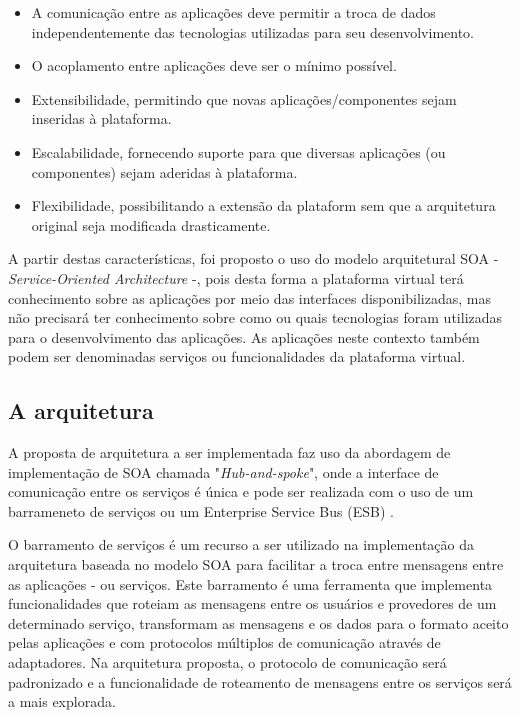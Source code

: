 \begin{itemize}
\item A comunicação entre as aplicações deve permitir a troca de dados independentemente das tecnologias utilizadas para seu desenvolvimento.
\item O acoplamento entre aplicações deve ser o mínimo possível.
\item Extensibilidade, permitindo que novas aplicações/componentes sejam inseridas à plataforma.
\item Escalabilidade, fornecendo suporte para que diversas aplicações (ou componentes) sejam aderidas à plataforma.
\item Flexibilidade,  possibilitando a extensão da plataform sem que a arquitetura original seja modificada drasticamente.
\end{itemize}

A partir destas características, foi proposto o uso do modelo arquitetural SOA - \textit{Service-Oriented Architecture} -, pois desta forma a plataforma virtual terá conhecimento sobre as aplicações por meio das interfaces disponibilizadas, mas não precisará ter conhecimento sobre como ou quais tecnologias foram utilizadas para o desenvolvimento das aplicações. As aplicações neste contexto também podem ser denominadas serviços ou funcionalidades da plataforma virtual.

\subsection{A arquitetura}

A proposta de arquitetura a ser implementada faz uso da abordagem de implementação de SOA chamada "\textit{Hub-and-spoke}", onde a interface de comunicação entre os serviços é única e pode ser realizada com o uso de um barrameneto de serviços ou um Enterprise Service Bus (ESB) \cite{Bianco2007}.

O barramento de serviços é um recurso a ser utilizado na implementação da arquitetura baseada no modelo SOA para facilitar a troca entre mensagens entre as aplicações - ou serviços. Este barramento é uma ferramenta que implementa funcionalidades que roteiam as mensagens entre os usuários e provedores de um determinado serviço, transformam as mensagens e os dados para o formato aceito pelas aplicações e com protocolos múltiplos de comunicação através de adaptadores. Na arquitetura proposta, o protocolo de comunicação será padronizado e a funcionalidade de roteamento de mensagens entre os serviços será a mais explorada.

